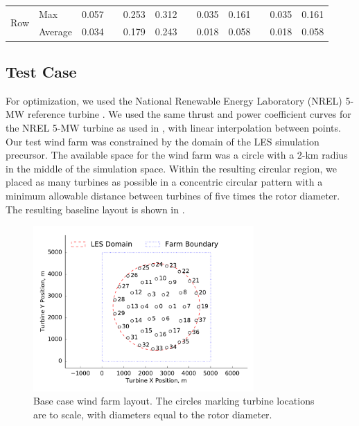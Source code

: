 \documentclass[conf]{new-aiaa}
\begin{document}
\begin{table}[htpb!]
\begin{tabular}{@{}llrcrrcrrcrr@{}}


\multicolumn{1}{c|}{\multirow{2}{*}{Row}} &  \multicolumn{1}{l}{Max} & 0.057 & & 0.253 & 0.312 & & 0.035 & 0.161 & & 0.035 & 0.161\\
\multicolumn{1}{c|}{} &  \multicolumn{1}{l}{Average} & 0.034 & & 0.179 &0.243 & & 0.018 & 0.058 & & 0.018 & 0.058 \\

 \bottomrule
\end{tabular}

\end{table}

\subsection{Test Case}\label{sec:testcase}

For optimization, we used the National Renewable Energy Laboratory (NREL) 5-MW reference turbine \cite{jonkman2009definition}. We used the same thrust and power coefficient curves for the NREL 5-MW turbine as used in \cite{gebraad2017-max-aep}, with linear interpolation between points. Our test wind farm was constrained by the domain of the LES simulation precursor. The available space for the wind farm was a circle with a 2-km radius in the middle of the simulation space. Within the resulting circular region, we placed as many turbines as possible in a concentric circular pattern with a minimum allowable distance between turbines of five times the rotor diameter. The resulting baseline layout is shown in .    

\begin{figure}[ht]
	\centering
	\includegraphics[width=0.75\textwidth]{final_images/round_farm_38Turbines_5DSpacing_start.pdf}
	\caption{Base case wind farm layout. The circles marking turbine locations are to scale, with diameters equal to the rotor diameter.}
	\label{fig:starting-layout}
\end{figure}
\end{document}
